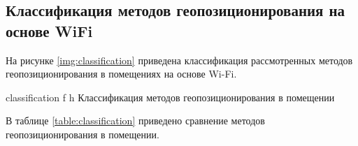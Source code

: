 




\clearpage

\subsection{Классификация методов геопозиционирования на основе WiFi}

На рисунке \ref{img:classification} приведена классификация рассмотренных методов геопозиционирования в помещениях на основе Wi-Fi.

    {classification}
    {f}
    {h}
    {\linewidth}
    {Классификация методов геопозиционирования в помещении}

\clearpage

В таблице \ref{table:classification} приведено сравнение методов геопозиционирования в помещении.

